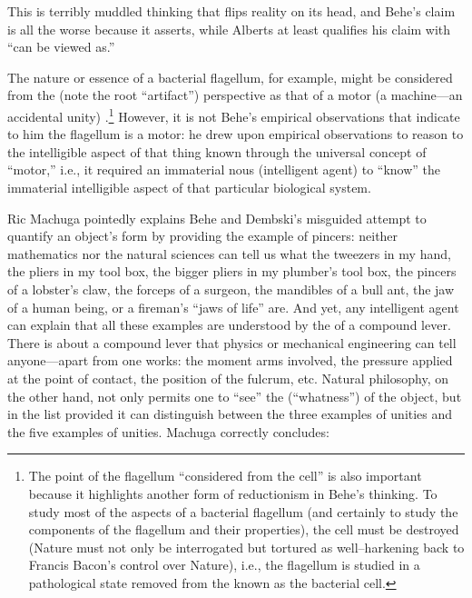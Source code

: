 This is terribly muddled thinking that flips reality on its head, and Behe's claim is all the worse because it asserts, while Alberts at least qualifies his claim with ``can be viewed as.''

The nature or essence of a bacterial flagellum, for example, might be considered from the  (note the root ``artifact'') perspective as that of a motor (a machine---an accidental unity) .\footnote{The point of the flagellum ``considered  from the cell'' is also important because it highlights another form of reductionism in Behe's thinking. To study most of the aspects of a bacterial flagellum (and certainly to study the components of the flagellum and their properties), the cell must be destroyed (Nature must not only be interrogated but tortured as well--harkening back to Francis Bacon's  control over Nature), i.e., the flagellum is studied in a pathological state removed from the  known as the bacterial cell.} However, it is not Behe's empirical observations that indicate to him the flagellum is a motor: he drew upon empirical observations to reason to the intelligible aspect of that thing known through the universal concept of ``motor,'' i.e., it required an immaterial nous (intelligent agent) to ``know'' the immaterial intelligible aspect of that particular biological system.

Ric Machuga pointedly explains Behe and Dembski's misguided attempt to quantify an object's form by providing the example of pincers: neither mathematics nor the natural sciences can tell us what the tweezers in my hand, the pliers in my tool box, the bigger pliers in my plumber's tool box, the pincers of a lobster's claw, the forceps of a surgeon, the mandibles of a bull ant, the jaw of a human being, or a fireman's ``jaws of life'' are. And yet, any intelligent agent can explain that all these examples are understood by the  of a compound lever. There is  about  a compound lever  that physics or mechanical engineering can tell anyone---apart from  one works: the moment arms involved, the pressure applied at the point of contact, the position of the fulcrum, etc. Natural philosophy, on the other hand, not only permits one to ``see'' the  (``whatness'') of the object, but in the list provided it can distinguish between the three examples of  unities and the five examples of  unities. Machuga correctly concludes:


